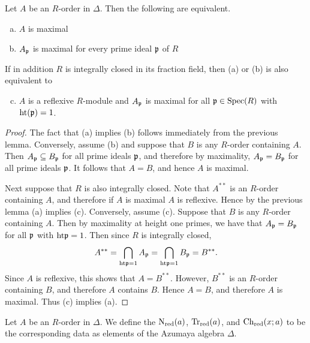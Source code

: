\begin{cor}
Let $A$ be an $R$-order in $\Delta$.  Then the following are equivalent.
\begin{enumerate}[(a)]
\item  $A$ is maximal
\item  $A_{\mathfrak{p}}$ is maximal for every prime ideal $\mathfrak{p}$ of $R$
\end{enumerate}
If in addition $R$ is integrally closed in its fraction field, then (a) or (b) is also equivalent to
\begin{enumerate}[(a)]
\setcounter{enumi}{2}
\item  $A$ is a reflexive $R$-module and $A_{\mathfrak{p}}$ is maximal for all $\mathfrak{p}\in\textnormal{Spec}(R)$ with $\textnormal{ht}(\mathfrak{p})=1$.
\end{enumerate}
\end{cor}
\begin{proof}
The fact that (a) implies (b) follows immediately from the previous lemma.  Conversely, assume (b) and suppose that $B$ is any $R$-order containing $A$.  Then $A_{\mathfrak{p}}\subseteq B_{\mathfrak{p}}$ for all prime ideals $\mathfrak{p}$, and therefore by maximality, $A_{\mathfrak{p}} = B_{\mathfrak{p}}$ for all prime ideals $\mathfrak{p}$.  It follows that $A = B$, and hence $A$ is maximal.

Next suppose that $R$ is also integrally closed.  Note that $A^{**}$ is an $R$-order containing $A$, and therefore if $A$ is maximal $A$ is reflexive.  Hence by the previous lemma (a) implies (c).  Conversely, assume (c).  Suppose that $B$ is any $R$-order containing $A$.  Then by maximality at height one primes, we have that $A_{\mathfrak{p}} = B_{\mathfrak{p}}$ for all $\mathfrak{p}$ with $\textnormal{ht}\mathfrak{p} = 1$.  Then since $R$ is integrally closed,
$$A^{**} = \bigcap_{\textnormal{ht}\mathfrak{p} = 1} A_{\mathfrak{p}} = \bigcap_{\textnormal{ht}\mathfrak{p} = 1} B_{\mathfrak{p}} = B^{**}.$$
Since $A$ is reflexive, this shows that $A = B^{**}$.  However, $B^{**}$ is an $R$-order containing $B$, and therefore $A$ contains $B$.  Hence $A = B$, and therefore $A$ is maximal.  Thus (c) implies (a).
\end{proof}

\begin{defn}
Let $A$ be an $R$-order in $\Delta$.  We define the  $\textnormal{N}_{\text{red}}(a)$,  $\textnormal{Tr}_{\text{red}}(a)$, and  $\textnormal{Ch}_{\text{red}}(x;a)$ to be the corresponding data as elements of the Azumaya algebra $\Delta$.
\end{defn}

